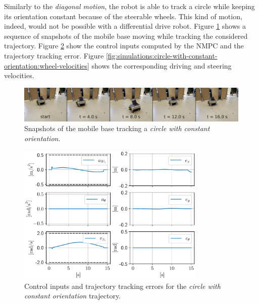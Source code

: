 Similarly to the \textit{diagonal motion}, the robot is able to track a circle while keeping its orientation constant because of the steerable wheels. This kind of motion, indeed, would not be possible with a differential drive robot.
Figure \ref{fig:experiments:circle-with-constant-orientation:snapshots} shows a sequence of snapshots of the mobile base moving while tracking the considered trajectory. Figure \ref{fig:simulations:circle-with-constant-orientation:inputs-and-errors} show the control inputs computed by the NMPC and the trajectory tracking error. Figure \ref{fig:simulations:circle-with-constant-orientation:wheel-velocities} shows the corresponding driving and steering velocities.
\begin{figure}
    \centering
    \includegraphics[width=\textwidth]{figures/SWMR/simulations/circular_with_constant_orientation/snapshots.jpeg}
    \caption{Snapshots of the mobile base tracking a \textit{circle with constant orientation}.}
    \label{fig:experiments:circle-with-constant-orientation:snapshots}
\end{figure}
\begin{figure}
    \centering
    \includegraphics[width=0.8\textwidth]{figures/SWMR/simulations/circular_with_constant_orientation/inputs_and_errors.pdf}
    \caption{Control inputs and trajectory tracking errors for the \textit{circle with constant orientation} trajectory.}
    \label{fig:simulations:circle-with-constant-orientation:inputs-and-errors}
\end{figure}
